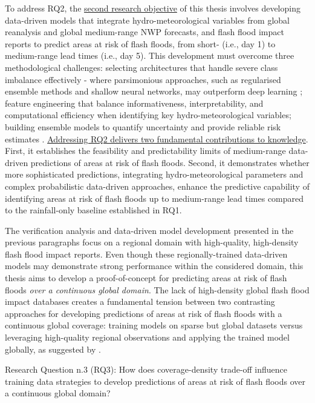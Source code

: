 To address RQ2, the \uline{second research objective} of this thesis involves developing data-driven models that integrate hydro-meteorological variables from global reanalysis and global medium-range NWP forecasts, and flash flood impact reports to predict areas at risk of flash floods, from short- (i.e., day 1) to medium-range lead times (i.e., day 5). This development must overcome three methodological challenges: selecting architectures that handle severe class imbalance effectively - where parsimonious approaches, such as regularised ensemble methods and shallow neural networks, may outperform deep learning \citep{Kumar_2021, Xu_2022, Luo_2025a}; feature engineering that balance informativeness, interpretability, and computational efficiency when identifying key hydro-meteorological variables; building ensemble models to quantify uncertainty and provide reliable risk estimates \citep{Saleh_2024}. \uline{Addressing RQ2 delivers two fundamental contributions to knowledge}. First, it establishes the feasibility and predictability limits of medium-range data-driven predictions of areas at risk of flash floods. Second, it demonstrates whether more sophisticated predictions, integrating hydro-meteorological parameters and complex probabilistic data-driven approaches, enhance the predictive capability of identifying areas at risk of flash floods up to medium-range lead times compared to the rainfall-only baseline established in RQ1. 

The  verification analysis and data-driven model development presented in the previous paragraphs focus on a regional domain with high-quality, high-density flash flood impact reports. Even though these regionally-trained data-driven models may demonstrate strong performance within the considered domain, this thesis aims to develop a proof-of-concept for predicting areas at risk of flash floods \textit{over a continuous global domain}. The lack of high-density global flash flood impact databases \citep{Panwar_2020} creates a fundamental tension between two contrasting approaches for developing predictions of areas at risk of flash floods with a continuous global coverage: training models on sparse but global datasets versus leveraging high-quality regional observations and applying the trained model globally, as suggested by \citet{Kratzert_2024}. 

\begin{tcolorbox}[
  colframe=colour_chapter7,  
  colback=white,           
  sharp corners,        
  boxrule=2mm,          
  left=0mm,             
  right=0mm,            
  toprule=0mm,          
  bottomrule=0mm,       
  rightrule=2mm        
]
{\color{colour_chapter7} {\setlength{\parindent}{1.0em} Research Question n.3 (RQ3): How does coverage-density trade-off influence training data strategies to develop predictions of areas at risk of flash floods over a continuous global domain?}}
\end{tcolorbox}

